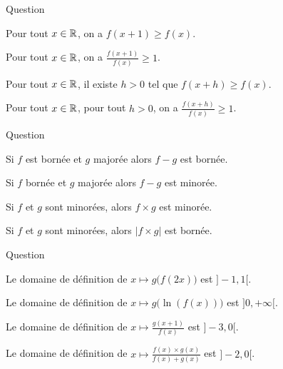 \begin{multi}[multiple,feedback=
{En notant \(y = x+h\) avec \(h>0\) on a \(y > x\) et donc il suffit d'avoir \(\frac{f(y)}{f(x)} \ge 1\).
Par contre, il n'est pas suffisant de comparer \(f\) en des valeurs distantes de \(1\) ! Essayez de dessiner un contre-exemple : \(f\) vaut \(0\) partout, sauf \(1\) en chaque entier.
}]{Question}
    \item Pour tout \(x\in\mathbb{R}\), on a \(f(x+1) \ge f(x)\).
    \item Pour tout \(x\in\mathbb{R}\), on a \(\frac{f(x+1)}{f(x)} \ge 1\).
    \item Pour tout \(x\in\mathbb{R}\), il existe \(h>0\) tel que \(f(x+h) \ge f(x)\).
    \item* Pour tout \(x\in\mathbb{R}\), pour tout \(h>0\), on a \(\frac{f(x+h)}{f(x)} \ge 1\).
\end{multi}


\begin{multi}[multiple,feedback=
{La somme de deux fonctions majorées (resp. minorées) est majorée (resp. minorée). Ce n'est pas le cas pour le produit : par exemple
\(f(x) = -1\) est minorée, \(g(x) = \exp(x)\) aussi, mais \(f \times g (x) = -\exp(x)\) ne l'est pas.
}]{Question}
    \item Si \(f\) est bornée et \(g\) majorée alors \(f-g\) est bornée.
    \item* Si \(f\) bornée et \(g\) majorée alors \(f-g\) est minorée.
    \item Si \(f\) et \(g\) sont minorées, alors \(f \times g\) est minorée.
    \item Si \(f\) et \(g\) sont minorées, alors \(|f \times g|\) est bornée.
\end{multi}


\begin{multi}{Question}
    \item Le domaine de définition de \(x \mapsto g\big(f(2x)\big)\) est \(]-1,1[\).
    \item Le domaine de définition de \(x \mapsto g\big( \ln (f(x)) \big)\) est \(]0,+\infty[\).
    \item* Le domaine de définition de \(x \mapsto \frac{g(x+1)}{f(x)}\) est \(]-3,0[\).
    \item* Le domaine de définition de \(x \mapsto \frac{f(x) \times g(x)}{f(x)+g(x)}\) est \(]-2,0[\).
\end{multi}


